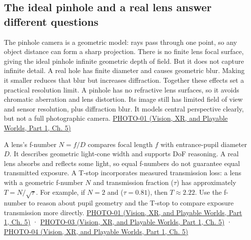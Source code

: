 \subsection{The ideal pinhole and a real lens answer different questions}\label{03-visual-computing-i-ch003-the-ideal-pinhole-and-a-real-lens-answer-different-questions}

\hypertarget{03-visual-computing-i-ch003-the-ideal-pinhole-and-a-real-lens-answer-different-questions}{}

The pinhole camera is a geometric model: rays pass through one point, so any object distance can form a sharp projection. There is no finite lens focal surface, giving the ideal pinhole infinite geometric depth of field. But it does not capture infinite detail. A real hole has finite diameter and causes geometric blur. Making it smaller reduces that blur but increases diffraction. Together these effects set a practical resolution limit. A pinhole has no refractive lens surfaces, so it avoids chromatic aberration and lens distortion. Its image still has limited field of view and sensor resolution, plus diffraction blur. It models central perspective clearly, but not a full photographic camera. \href{../07-Vision-XR-and-Playable-Worlds-P01/main.pdf\#nameddest=04-visual-computing-ii-ch036-photo-01---photography-session-01}{PHOTO-01 (Vision, XR, and Playable Worlds, Part 1, Ch. 5)}

A lens's f-number \(N=f/D\) compares focal length \(f\) with entrance-pupil diameter \(D\). It describes geometric light-cone width and supports DoF reasoning. A real lens absorbs and reflects some light, so equal f-numbers do not guarantee equal transmitted exposure. A T-stop incorporates measured transmission loss: a lens with a geometric f-number \(N\) and transmission fraction (\(\tau\)) has approximately \(T=N/\sqrt{\tau}\). For example, if \(N=2\) and (\(\tau=0.81\)), then \(T\approx2.22\). Use the f-number to reason about pupil geometry and the T-stop to compare exposure transmission more directly. \href{../07-Vision-XR-and-Playable-Worlds-P01/main.pdf\#nameddest=04-visual-computing-ii-ch036-photo-01---photography-session-01}{PHOTO-01 (Vision, XR, and Playable Worlds, Part 1, Ch. 5)} · \href{../07-Vision-XR-and-Playable-Worlds-P01/main.pdf\#nameddest=04-visual-computing-ii-ch036-photo-03---photography-session-03}{PHOTO-03 (Vision, XR, and Playable Worlds, Part 1, Ch. 5)} · \href{../07-Vision-XR-and-Playable-Worlds-P01/main.pdf\#nameddest=04-visual-computing-ii-ch036-photo-04---photography-session-04}{PHOTO-04 (Vision, XR, and Playable Worlds, Part 1, Ch. 5)}

